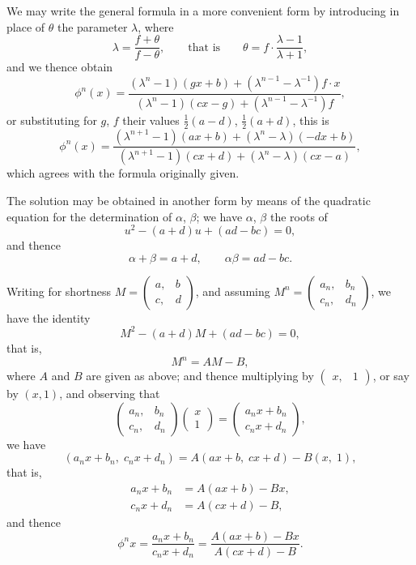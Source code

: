 \documentclass[12pt,a4paper]{article}
\begin{document}
We may write the general formula in a more convenient form by introducing
in place of $\theta$ the parameter $\lambda$, where
%
\[
\lambda = \frac{f+\theta}{f-\theta}, \qquad \text{that is} \qquad
\theta = f \cdot \frac{\lambda - 1}{\lambda + 1},
\]
%
and we thence obtain
%
\[
\phi^n(x) = \frac{(\lambda^n - 1)(gx+b) + (\lambda^{n-1} - \lambda^{-1})f \cdot x}
{(\lambda^n - 1)(cx-g) + (\lambda^{n-1} - \lambda^{-1})f},
\]
%
or substituting for $g$, $f$ their values $\tfrac{1}{2}(a-d)$, $\tfrac{1}{2}(a+d)$, this is
%
\[
\phi^n(x) = \frac{(\lambda^{n+1}-1)(ax+b) + (\lambda^n - \lambda)(-dx+b)}
{(\lambda^{n+1}-1)(cx+d) + (\lambda^n - \lambda)(cx-a)},
\]
%
which agrees with the formula originally given.

The solution may be obtained in another form by means of the quadratic equation
for the determination of $\alpha$, $\beta$; we have $\alpha$, $\beta$ the roots of
%
\[
u^2 - (a+d)u + (ad-bc) = 0,\]
%
and thence
%
\[
\alpha + \beta = a+d, \qquad \alpha\beta = ad-bc.
\]

\newpage


Writing for shortness $M = \left(\begin{array}{c|c} a, & b \\ \hline c, & d \end{array}\right)$,
and assuming $M^n = \left(\begin{array}{c|c} a_n, & b_n \\ \hline c_n, & d_n \end{array}\right)$,
we have the identity
%
\[
M^2 - (a+d)M + (ad-bc) = 0,
\]
%
that is,
%
\[
M^n = AM - B,
\]
%
where $A$ and $B$ are given as above; and thence multiplying by
$\left(\begin{array}{c|c} x, & 1 \end{array}\right)$, or say by $(x, 1)$, and observing that
%
\[
\left(\begin{array}{c|c} a_n, & b_n \\ \hline c_n, & d_n \end{array}\right)
\left(\begin{array}{c} x \\ \hline 1 \end{array}\right)
= \left(\begin{array}{c} a_n x + b_n \\ \hline c_n x + d_n \end{array}\right),
\]
%
we have
%
\[
(a_n x + b_n,\; c_n x + d_n) = A(ax+b,\; cx+d) - B(x,\; 1),
\]
%
that is,
\begin{align*}
a_n x + b_n &= A(ax+b) - Bx, \\
c_n x + d_n &= A(cx+d) - B,
\end{align*}
%
and thence
%
\[
\phi^n x = \frac{a_n x + b_n}{c_n x + d_n}
= \frac{A(ax+b) - Bx}{A(cx+d) - B}.
\]
\end{document}
